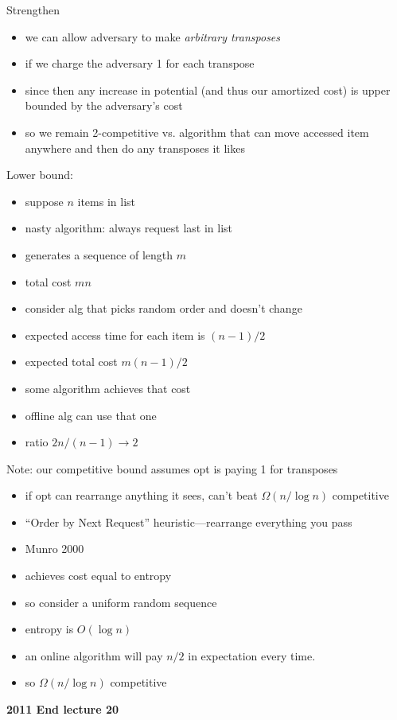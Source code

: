 \documentclass{article}
\begin{document}
Strengthen
\begin{itemize}
\item we can allow adversary to make \emph{arbitrary transposes}
\item if we charge the adversary 1 for each transpose
\item since then any increase in potential (and thus our
  amortized cost) is upper bounded by the adversary's cost
\item so we remain 2-competitive vs. algorithm that can move accessed
  item anywhere and then do any transposes it likes
\end{itemize}

Lower bound:
\begin{itemize}
\item suppose $n$ items in list
\item nasty algorithm: always request last in list
\item generates a sequence of length $m$
\item total cost $mn$
\item consider alg that picks random order and doesn't change
\item expected access time for each item is $(n-1)/2$
\item expected total cost $m(n-1)/2$
\item some algorithm achieves that cost
\item offline alg can use that one
\item ratio $2n/(n-1) \rightarrow 2$
\end{itemize}

Note: our competitive bound assumes opt is paying 1 for transposes
\begin{itemize}
\item if opt can rearrange anything it sees, can't beat $\Omega(n/\log n)$ competitive
\item ``Order by Next Request'' heuristic---rearrange everything you pass
\item Munro 2000
\item achieves cost equal to entropy
\item so consider a uniform random sequence
\item entropy is $O(\log n)$
\item an online algorithm will pay $n/2$ in expectation every time.
\item so $\Omega(n/\log n)$ competitive
\end{itemize}

\textbf{2011 End lecture 20}
\end{document}
